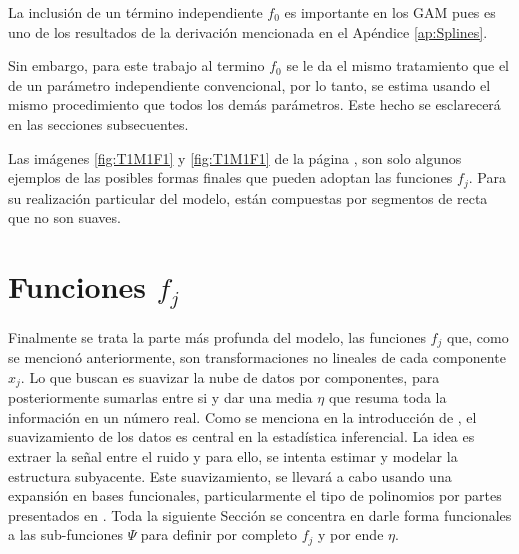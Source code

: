 \documentclass[../Main/Main.tex]{subfiles}
\begin{document}
La inclusión de un término independiente $f_0$ es importante en los GAM pues es uno de los resultados de la derivación mencionada en el Apéndice \ref{ap:Splines}. 


Sin embargo, para este trabajo al termino $f_0$ se le da el mismo tratamiento que el de un parámetro independiente convencional, por lo tanto, se estima usando el mismo procedimiento que todos los demás parámetros. Este hecho se esclarecerá en las secciones subsecuentes. 

Las imágenes \ref{fig:T1M1F1} y  \ref{fig:T1M1F1} de la página \pageref{fig:T1M1F1}, son solo algunos ejemplos de las posibles formas finales que pueden adoptan las funciones $f_j$. Para su realización particular del modelo, están compuestas por segmentos de recta que no son suaves.

\section{Funciones $f_j$} \label{sec:fj}
Finalmente se trata la parte más profunda del modelo, las funciones $f_j$  que, como se mencionó anteriormente, son transformaciones no lineales de cada componente $x_j$. Lo que buscan es suavizar la nube de datos por componentes, para posteriormente sumarlas entre si y dar una media $\eta$ que resuma toda la información en un número real. Como se menciona en la introducción de \citet{hardle2004semiparametric}, el suavizamiento de los datos es central en la estadística inferencial. La idea es extraer la señal entre el ruido y para ello, se intenta estimar y modelar la estructura subyacente. Este suavizamiento, se llevará a cabo usando una expansión en bases funcionales, particularmente el tipo de polinomios por partes presentados en \citet{mallik1998automatic}. Toda la siguiente Sección se concentra en darle forma funcionales a las sub-funciones $\Psi$ para definir por completo $f_j$ y por ende $\eta$. 
\end{document}
